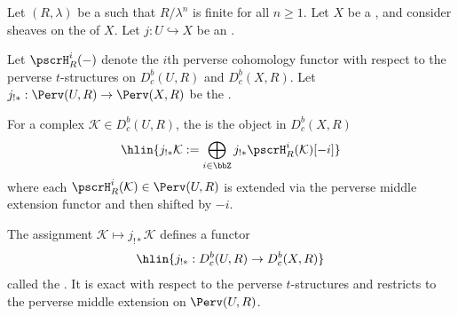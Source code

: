 \begin{definition} \label{definition:middle_extension_functor_for_constructible_complexes_with_integral_coefficients_on_open_immersion}
Let $(R, \lambda)$ be a   such that $R/\lambda^n$ is finite for all $n \geq 1$. Let $X$ be a , and consider sheaves on the  of $X$. Let $j: U \hookrightarrow X$ be an .

Let $\pscrH^i_R(-)$ denote the $i$th perverse cohomology functor with respect to the perverse $t$-structures on $D_c^b(U, R)$ and $D_c^b(X, R)$. Let $j_{!*}: \Perv(U, R) \to \Perv(X, R)$ be the .

For a complex $\mathcal{K} \in D_c^b(U, R)$, the  is the object in $D_c^b(X, R)$
$$\hlin{j_{!*} \mathcal{K} := \bigoplus_{i \in \bbZ} j_{!*} \pscrH^i_R(\mathcal{K})[-i]}$$
where each $\pscrH^i_R(\mathcal{K}) \in \Perv(U, R)$ is extended via the perverse middle extension functor and then shifted by $-i$.

The assignment $\mathcal{K} \mapsto j_{!*}\mathcal{K}$ defines a functor
$$\hlin{j_{!*}: D_c^b(U, R) \to D_c^b(X, R)}$$
called the . It is exact with respect to the perverse $t$-structures and restricts to the perverse middle extension on $\Perv(U, R)$.
\end{definition}
